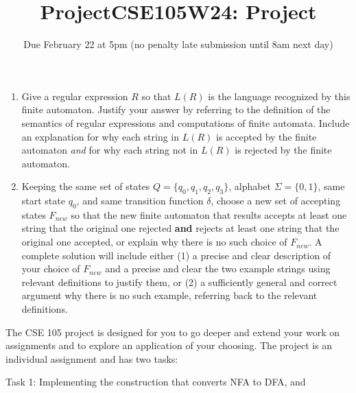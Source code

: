 \begin{enumerate}[wide, labelwidth=!, labelindent=0pt]
\begin{enumerate}
    \item Give a regular expression $R$ so that $L(R)$ is the language 
    recognized by this finite automaton. Justify your answer by referring to the 
    definition of the semantics of regular expressions and computations of finite automata. 
    Include an explanation for why each string in $L(R)$ is accepted by the finite automaton {\it and}
    for why each string not in $L(R)$ is rejected by the finite automaton.

    \item  Keeping the same set of states $Q = \{q_0, q_1, q_2, q_3\}$, alphabet $\Sigma = \{0,1\}$, 
    same start state $q_0$, and same transition 
    function $\delta$, choose a new set of accepting states $F_{new}$ so that the new 
    finite automaton that results accepts at least one string that the original one rejected {\bf and} rejects
    at least one string that the original one accepted, or explain why there is no such choice of $F_{new}$.
    A complete solution will include either (1) a precise and
    clear description of your choice of $F_{new}$
    and a precise and clear the two example strings using relevant definitions 
    to justify them, or (2) a sufficiently general and correct argument
    why there is no such example, referring back to the relevant definitions.

    \end{enumerate}
    
    \end{enumerate}
\newpage
\titleformat{\subsubsection}[runin]
   {\normalfont\bfseries}{}{}{}
   
\title{ProjectCSE105W24: Project}
\date{Due February 22 at 5pm (no penalty late submission until 8am next day)}


\maketitle

\thispagestyle{fancy}


The CSE 105 project is designed for you to go deeper and extend your work on assignments 
and to explore an application of your choosing. 
The project is an individual assignment and has two tasks: 

Task 1: Implementing the construction that converts NFA to DFA, and

